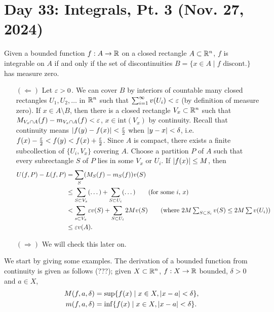 \section{Day 33: Integrals, Pt. 3 (Nov. 27, 2024)}
\begin{simplethm}
    Given a bounded function $f : A \to \mathbb R$ on a closed rectangle $A \subset \mathbb R^n$, $f$ is integrable on $A$ if and only if the set of discontinuities $B = \{x \in A \mid f \text{ discont.}\}$ has measure zero.
\end{simplethm}
\begin{itemize}
    \item[$(\Leftarrow)$] Let $\varepsilon > 0$. We can cover $B$ by interiors of countable many closed rectangles $U_1, U_2, \dots$ in $\mathbb R^n$ such that $\sum_{i=1}^\infty v(U_i) < \varepsilon$ (by definition of measure zero). If $x \in A \setminus B$, then there is a closed rectangle $V_x \subset \mathbb R^n$ such that $M_{V_x \cap A}(f) - m_{V_x \cap A}(f) < \varepsilon$, $x \in \mathrm{int}(V_x)$ by continuity. Recall that continuity means $\left\lvert f(y) - f(x) \right\rvert < \frac{\varepsilon}{2}$ when $\left\lvert y - x \right\rvert < \delta$, i.e. $f(x) - \frac{\varepsilon}{2} < f(y) < f(x) + \frac{\varepsilon}{2}$.
    \medskip\newline
    Since $A$ is compact, there exists a finite subcollection of $\{U_i, V_x\}$ covering $A$. Choose a partition $P$ of $A$ such that every subrectangle $S$ of $P$ lies in some $V_x$ or $U_i$. If $\left\lvert f(x) \right\rvert \leq M$, then
    \begin{align*}
        U(f, P) - L(f, P) &= \sum_S (M_S(f) - m_S(f)) v(S) \\
        &\leq \sum_{S \subset V_x} (\dots) + \sum_{S \subset U_i} (\dots) \tag{for some $i$, $x$} \\
        &< \sum_{s \subset V_x} \eps v(S) + \sum_{S \subset U_i} 2 M v(S) \tag{where $2M \sum_{S \subset S_i} v(S) \leq 2 M \sum v(U_i)$} \\
        &\leq \eps v(A).
    \end{align*}
    \item[$(\Rightarrow)$] We will check this later on.
\end{itemize}
We start by giving some examples. The derivation of a bounded function from continuity is given as follows (???); given $X \subset \mathbb R^n$, $f : X \to \mathbb R$ bounded, $\delta > 0$ and $a \in X$,
\begin{align*}
    M(f, a, \delta) &= \sup\{f(x) \mid x \in X, \left\lvert x - a \right\rvert < \delta\}, \\
    m(f, a, \delta) &= \inf\{f(x) \mid x \in X, \left\lvert x - a \right\rvert < \delta\}.
\end{align*}
